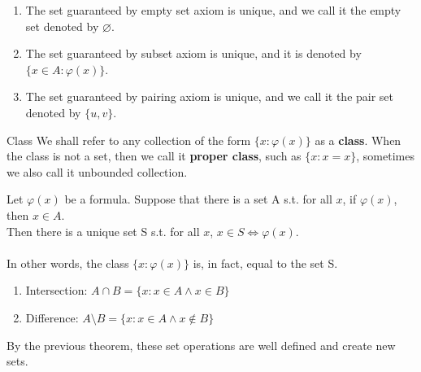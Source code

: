 \begin{remark}
    \begin{enumerate}
        \item The set guaranteed by empty set axiom is unique, and we call it the empty set denoted by $\varnothing$.\\
        \item The set guaranteed by subset axiom is unique, and it is denoted by $\{x \in A:\varphi(x)\}$.\\
        \item The set guaranteed by pairing axiom is unique, and we call it the pair set denoted by $\{u, v\}$.\\

    \end{enumerate}
\end{remark}

\begin{definition}{Class}{}
    We shall refer to any collection of the form $\{x:\varphi(x)\}$ as a \textbf{class}. When the class is not a set, then we call it \textbf{proper class}, such as $\{x:x=x\}$, sometimes we also call it unbounded collection.
\end{definition}

\begin{theorem}{}{}
    Let $\varphi(x)$ be a formula. Suppose that there is a set A s.t. for all $x$, if $\varphi(x)$, then $x \in A$.\\
    Then there is a unique set S s.t. for all $x$, $x \in S \iff \varphi(x)$. \\
    \\
    In other words, the class $\{x:\varphi(x)\}$ is, in fact, equal to the set S.
\end{theorem}

\begin{corollary}{}{}
    \begin{enumerate}
        \item Intersection: $A \cap B = \{x:x \in A \land x \in B\}$\\
        \item Difference: $A \setminus B = \{x:x \in A \land x \notin B\}$ \\
    \end{enumerate}
    By the previous theorem, these set operations are well defined and create new sets.
\end{corollary}
